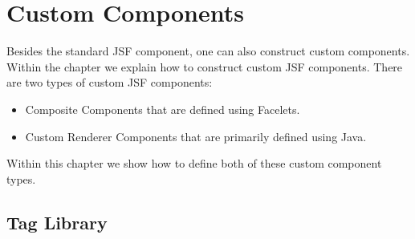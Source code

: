 %

\chapter{Custom Components}
Besides the standard JSF component, one can also construct custom components.
Within the chapter we explain how to construct custom JSF components.
There are two types of custom JSF components:
\begin{itemize}
	\item Composite Components that are defined using Facelets.
	\item Custom Renderer Components that are primarily defined using Java.
\end{itemize}
Within this chapter we show how to define both of these custom component types.

\section{Tag Library}

